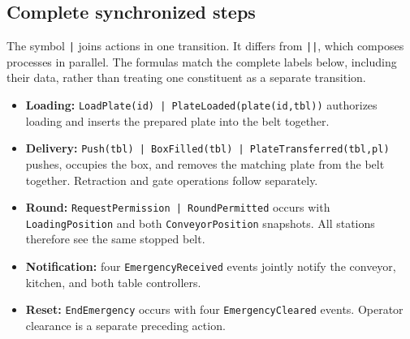 \documentclass[11pt,a4paper]{article}
\begin{document}
\subsection{Complete synchronized steps}
The symbol \texttt{|} joins actions in one transition. It differs from \texttt{||}, which composes processes in parallel. The formulas match the complete labels below, including their data, rather than treating one constituent as a separate transition.
\begin{itemize}
\item \textbf{Loading:} \texttt{LoadPlate(id) | PlateLoaded(plate(id,tbl))} authorizes loading and inserts the prepared plate into the belt together.
\item \textbf{Delivery:} \texttt{Push(tbl) | BoxFilled(tbl) | PlateTransferred(tbl,pl)} pushes, occupies the box, and removes the matching plate from the belt together. Retraction and gate operations follow separately.
\item \textbf{Round:} \texttt{RequestPermission | RoundPermitted} occurs with \texttt{LoadingPosition} and both \texttt{ConveyorPosition} snapshots. All stations therefore see the same stopped belt.
\item \textbf{Notification:} four \texttt{EmergencyReceived} events jointly notify the conveyor, kitchen, and both table controllers.
\item \textbf{Reset:} \texttt{EndEmergency} occurs with four \texttt{EmergencyCleared} events. Operator clearance is a separate preceding action.
\end{itemize}

\end{document}
